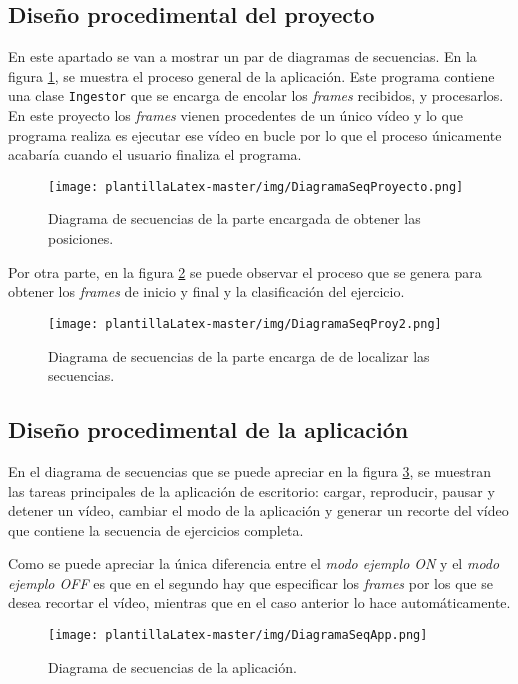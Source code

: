 \subsection{Diseño procedimental del proyecto}
En este apartado se van a mostrar un par de diagramas de secuencias. En la figura \ref{fig:DiagramaSeqProyecto}, se muestra el proceso general de la aplicación. Este programa contiene una clase \texttt{Ingestor} que se encarga de encolar los \textit{frames} recibidos, y procesarlos. En este proyecto los \textit{frames} vienen procedentes de un único vídeo y lo que programa realiza es ejecutar ese vídeo en bucle por lo que el proceso únicamente acabaría cuando el usuario finaliza el programa. 
\begin{figure}[H]
    \centering
    \texttt{[image: plantillaLatex-master/img/DiagramaSeqProyecto.png]}
    \caption{Diagrama de secuencias de la parte encargada de obtener las posiciones.}
    \label{fig:DiagramaSeqProyecto}
\end{figure}

Por otra parte, en la figura \ref{fig:DiagramaSeqProy2} se puede observar el proceso que se genera para obtener los \textit{frames} de inicio y final y la clasificación del ejercicio. 

\begin{figure}[H]
    \centering
    \texttt{[image: plantillaLatex-master/img/DiagramaSeqProy2.png]}
    \caption{Diagrama de secuencias de la parte encarga de de localizar las secuencias.}
    \label{fig:DiagramaSeqProy2}
\end{figure}


\subsection{Diseño procedimental de la aplicación}
En el diagrama de secuencias que se puede apreciar en la figura \ref{fig:DiagramaSeqApp}, se muestran las tareas principales de la aplicación de escritorio: cargar, reproducir, pausar y detener un vídeo, cambiar el modo de la aplicación y generar un recorte del vídeo que contiene la secuencia de ejercicios completa.

Como se puede apreciar la única diferencia entre el \textit{modo ejemplo ON} y el \textit{modo ejemplo OFF} es que en el segundo hay que especificar los \textit{frames} por los que se desea recortar el vídeo, mientras que en el caso anterior lo hace automáticamente.

\begin{figure}[H]
    \centering
    \texttt{[image: plantillaLatex-master/img/DiagramaSeqApp.png]}
    \caption{Diagrama de secuencias de la aplicación.}
    \label{fig:DiagramaSeqApp}
\end{figure}



